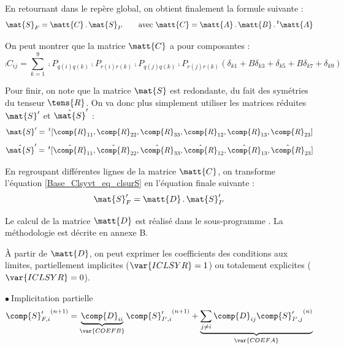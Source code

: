 En retournant dans le rep\`ere global, on obtient finalement la formule suivante
:
\begin{equation}
\label{Base_Clsyvt_eq_clsurS}
\mat{S}_F=\matt{C}\,.\,\mat{S}_{I'}\qquad
\text{avec }\matt{C}=\matt{A}\,.\,\matt{B}\,.\,^t\matt{A}
\end{equation}

On peut montrer que la matrice $\matt{C}$ a pour composantes :
\begin{equation}
\comp{C}_{ij}=\sum_{k=1}^9
\comp{P}_{q(i)q(k)}\comp{P}_{r(i)r(k)}\comp{P}_{q(j)q(k)}\comp{P}_{r(j)r(k)}
(\delta_{k1}+B\delta_{k3}+\delta_{k5}+B\delta_{k7}+\delta_{k9})
\end{equation}


Pour finir, on note que la matrice $\mat{S}$ est redondante, du fait des
sym\'etries du tenseur $\tens{R}$. On va donc plus simplement utiliser les
matrices r\'eduites $\mat{S}^\prime$ et $\hat{\mat{S}}^\prime$ :
\begin{equation}
\mat{S}^\prime=\,^t[\comp{R}_{11},\comp{R}_{22},\comp{R}_{33},
\comp{R}_{12},\comp{R}_{13},\comp{R}_{23}]
\end{equation}
\begin{equation}
\hat{\mat{S}}^\prime=\,^t[\hat{\comp{R}}_{11},\hat{\comp{R}}_{22},\hat{\comp{R}}_{33},
\hat{\comp{R}}_{12},\hat{\comp{R}}_{13},\hat{\comp{R}}_{23}]
\end{equation}

En regroupant diff\'erentes lignes de la matrice $\matt{C}$, on transforme
l'\'equation \ref{Base_Clsyvt_eq_clsurS} en l'\'equation finale suivante :
\begin{equation}
\mat{S}_F^\prime=\matt{D}\,.\,\mat{S}_{I'}^\prime
\end{equation}

Le calcul de la matrice $\matt{D}$ est r\'ealis\'e dans le sous-programme
. La m\'ethodologie est d\'ecrite en annexe B.

\`A partir de $\matt{D}$, on peut exprimer les coefficients des conditions aux
limites, partiellement implicites ($\var{ICLSYR}=1$) ou totalement explicites
($\var{ICLSYR}=0$).

$\bullet\ ${\sc Implicitation partielle}\\
\begin{equation}
\label{Base_Clsyvt_eq_clRimp}
{\comp{S}_{F,i}^\prime}^{(n+1)} =
\underbrace{\comp{D}_{ii}}_{\var{COEFB}}{\comp{S}_{I',i}^\prime}^{(n+1)}
+\underbrace{\sum_{j\ne i}\comp{D}_{ij}{\comp{S}_{I',j}^\prime}^{(n)}}_{\var{COEFA}}
\end{equation}


